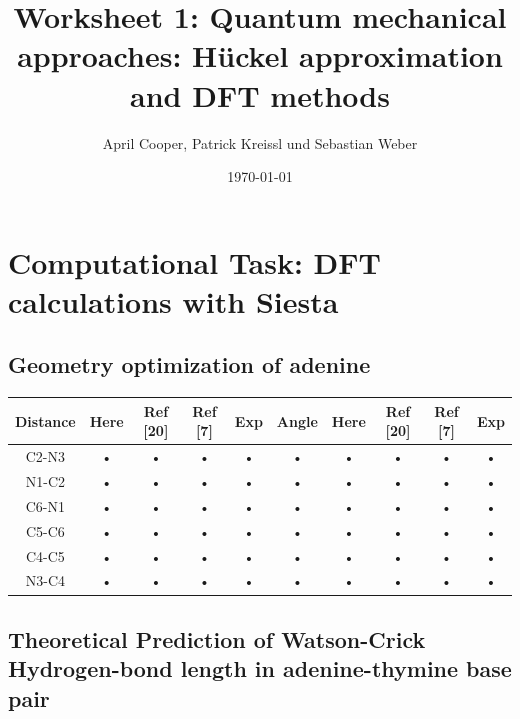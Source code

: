 \documentclass[12pt,a4paper]{scrartcl}
\author{April Cooper, Patrick Kreissl und Sebastian Weber}
\title{Worksheet 1: Quantum mechanical approaches:
Hückel approximation and DFT methods}
\date{\today}
\begin{document}
\maketitle
\tableofcontents
\newpage

\section{Computational Task: DFT calculations with Siesta}

\subsection{Geometry optimization of adenine}

\begin{tabular}{|c|c|c|c|c|c|c|c|c|c|}
\hline 
Distance & Here & Ref [20] & Ref [7] & Exp & Angle & Here & Ref [20] & Ref [7] & Exp \\ 
\hline 
C2-N3 & • & • & • & • & • & • & • & • & • \\ 
\hline 
N1-C2 & • & • & • & • & • & • & • & • & • \\ 
\hline 
C6-N1 & • & • & • & • & • & • & • & • & • \\ 
\hline 
C5-C6 & • & • & • & • & • & • & • & • & • \\ 
\hline 
C4-C5 & • & • & • & • & • & • & • & • & • \\ 
\hline 
N3-C4 & • & • & • & • & • & • & • & • & • \\ 
\hline 
\end{tabular} 

\newpage

\subsection{Theoretical Prediction of Watson-Crick Hydrogen-bond length in
adenine-thymine base pair}
\end{document}
